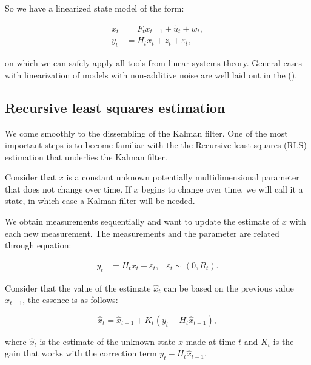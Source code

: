 So we have a linearized state model of the form:

\begin{subequations}
\begin{align*}
x_t &= F_t x_{t-1} + \tilde{u}_t + {w}_t,\\
y_t &= H_t x_t + z_t + \varepsilon_t,
\end{align*}
\end{subequations}

\noindent on which we can safely apply all tools from linear systems theory. General cases with linearization of models with non-additive noise are well laid out in the  (\cite[section~1.3]{simon_optimal_2006}).

\subsection{Recursive least squares estimation}
We come smoothly to the dissembling of the Kalman filter. One of the most important steps is to become familiar with the the Recursive least squares (RLS) estimation that underlies the Kalman filter.

Consider that \(x\) is a constant unknown potentially multidimensional parameter that does not change over time. If \(x\) begins to change over time, we will call it a state, in which case a Kalman filter will be needed.

We obtain measurements sequentially and want to update the estimate of \(x\) with each new measurement. The measurements and the parameter are related through equation:
    
\begin{equation*}
\begin{aligned}
y_t &= H_t x_t + \varepsilon_t, &\varepsilon_t \sim (0, R_t).
\end{aligned}
\end{equation*}

Consider that the value of the estimate \(\hat{x}_t\) can be based on the previous value \(\hat{x}_{t-1}\), the essence is as follows:

\begin{equation}
\hat{x}_t = \hat{x}_{t-1} + K_t(y_t - H_t \hat{x}_{t-1}) \label{eq:kf_correction},
\end{equation}

\noindent where \(\hat{x}_t\) is the estimate of the unknown state $x$ made at time \(t\) and \(K_t\) is the gain that works with the correction term \(y_t - H_t \hat{x}_{t-1}\).

